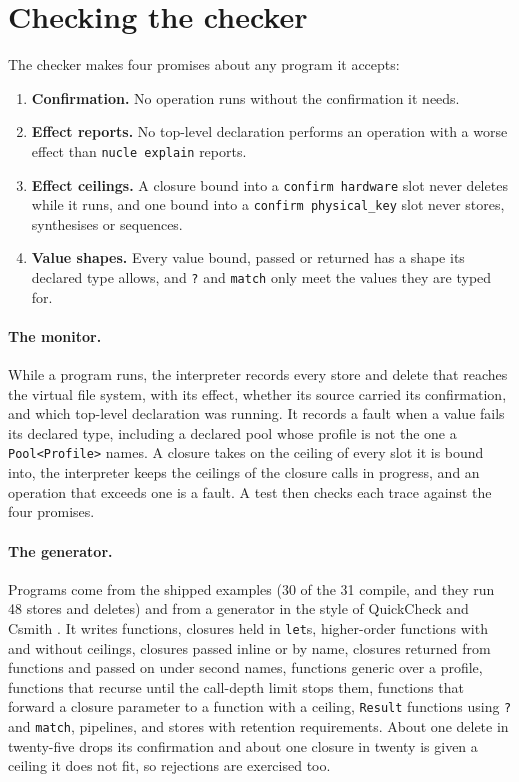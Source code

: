 \documentclass[11pt,a4paper]{article}
\newcommand{\nsl}[1]{\texttt{#1}}
\begin{document}
\section{Checking the checker}
\label{sec:monitor}

The checker makes four promises about any program it accepts:
\begin{enumerate}[leftmargin=*,itemsep=2pt]
\item \textbf{Confirmation.} No operation runs without the confirmation
  it needs.
\item \textbf{Effect reports.} No top-level declaration performs an
  operation with a worse effect than \nsl{nucle explain} reports.
\item \textbf{Effect ceilings.} A closure bound into a
  \nsl{confirm hardware} slot never deletes while it runs, and one bound
  into a \nsl{confirm physical\_key} slot never stores, synthesises or
  sequences.
\item \textbf{Value shapes.} Every value bound, passed or returned has a
  shape its declared type allows, and \nsl{?} and \nsl{match} only meet
  the values they are typed for.
\end{enumerate}

\paragraph{The monitor.} While a program runs, the interpreter records
every store and delete that reaches the virtual file system, with its
effect, whether its source carried its confirmation, and which top-level
declaration was running. It records a fault when a value fails its
declared type, including a declared pool whose profile is not the one a
\nsl{Pool<Profile>} names. A closure takes on the ceiling of every slot
it is bound into, the interpreter keeps the ceilings of the closure calls
in progress, and an operation that exceeds one is a fault. A test then
checks each trace against the four promises.

\paragraph{The generator.} Programs come from the shipped examples (30 of
the 31 compile, and they run 48 stores and deletes) and from a generator
in the style of QuickCheck \cite{quickcheck} and Csmith \cite{csmith}.
It writes functions, closures held in \nsl{let}s, higher-order functions
with and without ceilings, closures passed inline or by name, closures
returned from functions and passed on under second names, functions
generic over a profile, functions that recurse until the call-depth limit
stops them, functions that forward a closure parameter to a function
with a ceiling, \nsl{Result} functions using \nsl{?} and \nsl{match},
pipelines, and stores with retention requirements. About one delete in
twenty-five drops its confirmation and about one closure in twenty is
given a ceiling it does not fit, so rejections are exercised too.
\end{document}
